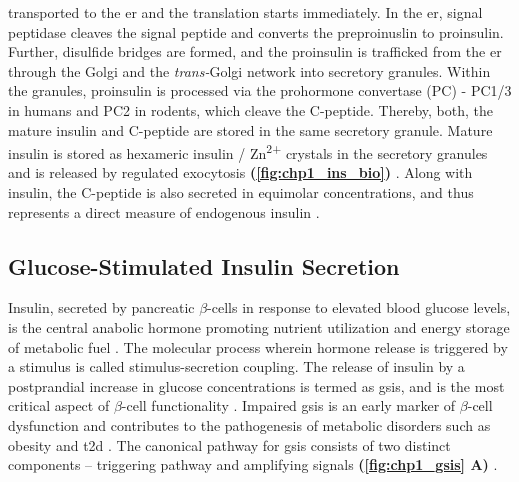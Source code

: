 transported to the \gls{er} and the translation starts immediately. In the \gls{er}, signal peptidase cleaves the signal peptide and converts the preproinuslin to proinsulin. Further, disulfide bridges are formed, and the proinsulin is trafficked from the \gls{er} through the Golgi and the \textit{trans-}Golgi network into secretory granules. Within the granules, proinsulin is processed via the prohormone convertase (PC) - PC1/3 in humans and PC2 in rodents, which cleave the C-peptide. Thereby, both, the mature insulin and C-peptide are stored in the same secretory granule. Mature insulin is stored as hexameric insulin / Zn\textsuperscript{2+} crystals in the secretory granules and is released by regulated exocytosis \textbf{(\autoref{fig:chp1_ins_bio})} \textbf{\cite{vasiljevic_making_2020,tokarz_cell_2018}}. Along with insulin, the C-peptide is also secreted in equimolar concentrations, and thus represents a direct measure of endogenous insulin \textbf{\cite{venugopal_biochemistry_2024}}. 


\subsection[Glucose-Stimulated Insulin Secretion]{Glucose-Stimulated Insulin Secretion} %
\label{sec:gsis}


\par Insulin, secreted by pancreatic $\beta$-cells in response to elevated blood glucose levels, is the central anabolic hormone promoting nutrient utilization and energy storage of metabolic fuel \textbf{\cite{slack_developmental_1995}}. The molecular process wherein hormone release is triggered by a stimulus is called stimulus-secretion coupling. The release of insulin by a postprandial increase in glucose concentrations is termed as \acrfull{gsis}, and is the most critical aspect of $\beta$-cell functionality \textbf{\cite{ashcroft_stimulussecretion_1994}}.  Impaired \gls{gsis} is an early marker of $\beta$-cell dysfunction and contributes to the pathogenesis of metabolic disorders such as obesity and \gls{t2d} \textbf{\cite{jensen_metabolic_2008}}. The canonical pathway for \gls{gsis} consists of two distinct components – triggering pathway and amplifying signals \textbf{(\autoref{fig:chp1_gsis} A)} \textbf{\cite{henquin_triggering_2000}}.\\

